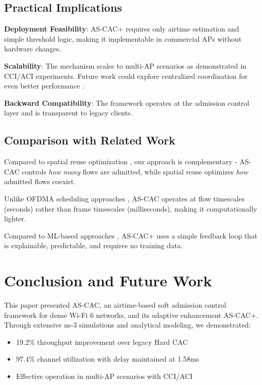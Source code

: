 \documentclass[conference]{IEEEtran}
\begin{document}
\subsection{Practical Implications}

\textbf{Deployment Feasibility}: AS-CAC+ requires only airtime estimation and simple threshold logic, making it implementable in commercial APs without hardware changes.

\textbf{Scalability}: The mechanism scales to multi-AP scenarios as demonstrated in CCI/ACI experiments. Future work could explore centralized coordination for even better performance \cite{18}.

\textbf{Backward Compatibility}: The framework operates at the admission control layer and is transparent to legacy clients.

\subsection{Comparison with Related Work}

Compared to spatial reuse optimization \cite{1, 17}, our approach is complementary - AS-CAC controls \textit{how many} flows are admitted, while spatial reuse optimizes \textit{how} admitted flows coexist.

Unlike OFDMA scheduling approaches \cite{11, 15}, AS-CAC operates at flow timescales (seconds) rather than frame timescales (milliseconds), making it computationally lighter.

Compared to ML-based approaches \cite{18}, AS-CAC+ uses a simple feedback loop that is explainable, predictable, and requires no training data.

\section{Conclusion and Future Work}

This paper presented AS-CAC, an airtime-based soft admission control framework for dense Wi-Fi 6 networks, and its adaptive enhancement AS-CAC+. Through extensive ns-3 simulations and analytical modeling, we demonstrated:

\begin{itemize}
    \item 19.2\% throughput improvement over legacy Hard CAC
    \item 97.4\% channel utilization with delay maintained at 1.58ms
    \item Effective operation in multi-AP scenarios with CCI/ACI

\end{itemize}
\end{document}
